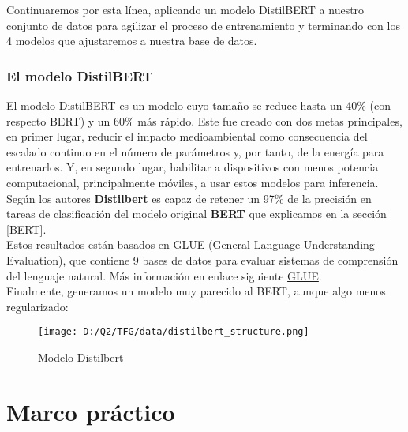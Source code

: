 \documentclass[10pt,riqno,a4paper,twoside]{article}\usepackage[]{graphicx}\usepackage[]{color}
\begin{document}
Continuaremos por esta línea, aplicando un modelo DistilBERT a nuestro conjunto de datos para agilizar el proceso de entrenamiento y terminando con los 4 modelos que ajustaremos a nuestra base de datos. 


\subsubsection{El modelo DistilBERT} 

El modelo DistilBERT es un modelo cuyo tamaño se reduce hasta un 40\% (con respecto BERT) y un 60\% más rápido. Este fue creado con dos metas principales, en primer lugar, reducir el impacto medioambiental como consecuencia del escalado continuo en el número de parámetros y, por tanto, de la energía para entrenarlos. Y, en segundo lugar, habilitar a dispositivos con menos potencia computacional, principalmente móviles, a usar estos modelos para inferencia. \\

Según los autores \textbf{Distilbert} \cite{distilBERT} es capaz de retener un 97\% de la precisión en tareas de clasificación del modelo original \textbf{BERT} que explicamos en la sección \ref{BERT}.\\

Estos resultados están basados en GLUE (General Language Understanding Evaluation), que contiene 9 bases de datos para evaluar sistemas de comprensión del lenguaje natural. Más información en enlace siguiente \href{https://gluebenchmark.com}{GLUE}. \\

Finalmente, generamos un modelo muy parecido al BERT, aunque algo menos regularizado:

\begin{figure}[h]
\caption{Modelo Distilbert}
\begin{center}
  \label{distilBERT_model}
\texttt{[image: D:/Q2/TFG/data/distilbert\_structure.png]}
\end{center}
\end{figure}









\section{Marco pr\'{a}ctico}
\end{document}
